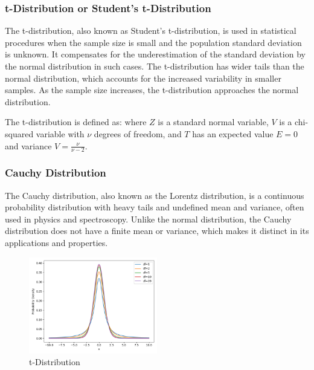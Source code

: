 \subsubsection{t-Distribution or Student's t-Distribution}\label{t-Distribution or Student's t-Distribution}
The t-distribution, also known as Student's t-distribution, is used in statistical procedures when the sample size is small and the population standard deviation is unknown. It compensates for the underestimation of the standard deviation by the normal distribution in such cases. The t-distribution has wider tails than the normal distribution, which accounts for the increased variability in smaller samples. As the sample size increases, the t-distribution approaches the normal distribution.

The t-distribution is defined as:
where $Z$ is a standard normal variable, $V$ is a chi-squared variable with $\nu$ degrees of freedom, and $T$ has an expected value $E=0$ and variance $V=\frac{\nu}{\nu-2}$.

\subsubsection{Cauchy Distribution}\label{Cauchy Distribution}
The Cauchy distribution, also known as the Lorentz distribution, is a continuous probability distribution with heavy tails and undefined mean and variance, often used in physics and spectroscopy. Unlike the normal distribution, the Cauchy distribution does not have a finite mean or variance, which makes it distinct in its applications and properties.

\begin{figure}[h]
    \centering
    \includegraphics[width=0.5\textwidth]{../images/plot_t_distributions_overlayed.png}
    \caption{t-Distribution}
    \label{fig:t_distribution}
\end{figure}

